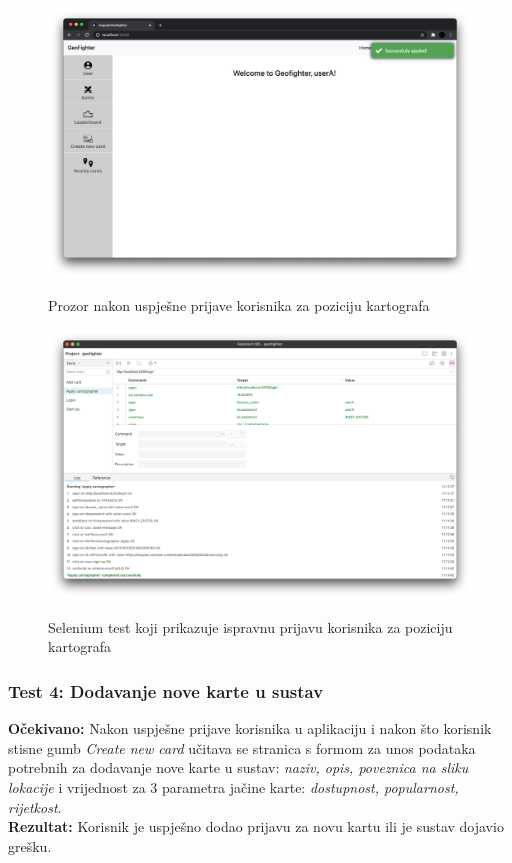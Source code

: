 			\begin{figure}[H]
				\centering
				\includegraphics[scale=0.27]{dokumentacija/slike/SeleniumCartographerSuccess.png} \\
				\caption{ Prozor nakon uspješne prijave korisnika za poziciju kartografa}
				\label{fig:SeleniumCartographerSuccess}
			\end{figure}

			\begin{figure}[H]
				\centering
				\includegraphics[scale=0.27]{dokumentacija/slike/SeleniumCartographerTest.png} \\
				\caption{ Selenium test koji prikazuje ispravnu prijavu korisnika za poziciju kartografa}
				\label{fig:SeleniumCartographerTest}
			\end{figure}

			\subsubsection{Test 4: Dodavanje nove karte u sustav}
			\textbf{Očekivano: } Nakon uspješne prijave korisnika u aplikaciju i nakon što korisnik stisne gumb \textit{Create new card} učitava se stranica s formom za unos podataka potrebnih za dodavanje nove karte u sustav: \textit{naziv, opis, poveznica na sliku lokacije} i vrijednost za 3 parametra jačine karte:  \textit{dostupnost, popularnost, rijetkost}.\\
			\textbf{Rezultat: } Korisnik  je uspješno dodao prijavu za novu kartu ili  je  sustav  dojavio grešku.\\

